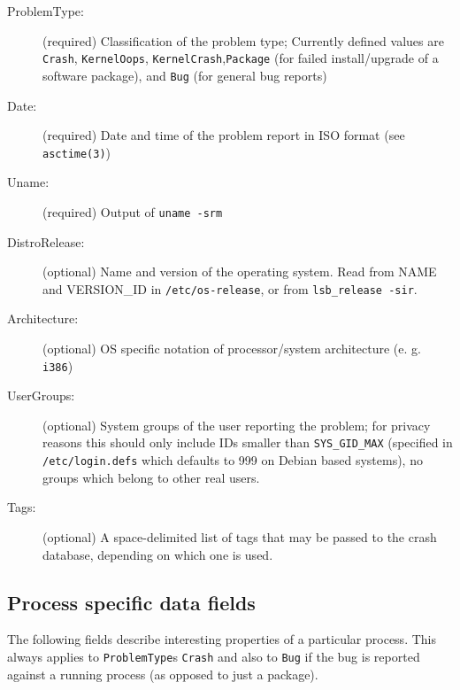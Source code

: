 \documentclass[DIV12,halfparskip]{scrartcl}
\begin{document}
\begin{description}
    \item [ProblemType:] (required) Classification of the problem type;
    Currently defined values are \verb!Crash!, \verb!KernelOops!,
    \verb!KernelCrash!,\verb!Package! (for failed install/upgrade of a software
    package), and \verb!Bug! (for general bug reports)

    \item [Date:] (required) Date and time of the problem report in ISO format
    (see \verb!asctime(3)!)

    \item [Uname:] (required) Output of \verb!uname -srm!

    \item [DistroRelease:] (optional) Name and version of the operating system.
      Read from NAME and VERSION\_ID in \verb!/etc/os-release!, or from
      \verb!lsb_release -sir!.

    \item [Architecture:] (optional) OS specific notation of
    processor/system architecture (e. g. \verb!i386!)

    \item [UserGroups:] (optional) System groups of the user reporting the
    problem; for privacy reasons this should only include IDs smaller than
    \verb!SYS_GID_MAX! (specified in \verb!/etc/login.defs! which defaults to 999 on
    Debian based systems), no groups which belong to other real users.

    \item [Tags:] (optional) A space-delimited list of tags that may be passed
    to the crash database, depending on which one is used.
\end{description}

\subsection{Process specific data fields}

The following fields describe interesting properties of a particular process.
This always applies to \verb!ProblemType!s \verb!Crash! and also to \verb!Bug!
if the bug is reported against a running process (as opposed to just a
package).
\end{document}
